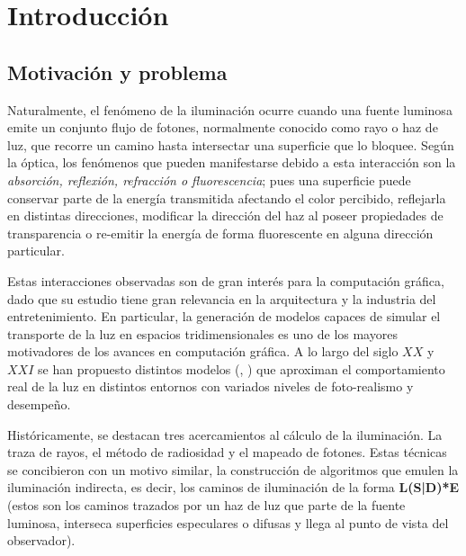 \chapter{Introducción}
\label{ch:chap01}




\section{Motivación y problema}
\label{sec:motivacionYProblemas}

Naturalmente, el fenómeno de la iluminación ocurre cuando una fuente luminosa emite un conjunto flujo de fotones, normalmente conocido como rayo o haz de luz, que recorre un camino hasta intersectar una superficie que lo bloquee. Según la óptica, los fenómenos que pueden manifestarse debido a esta interacción son la \textit{absorción, reflexión, refracción o fluorescencia}; pues una superficie puede conservar parte de la energía transmitida afectando el color percibido, reflejarla en distintas direcciones, modificar la dirección del haz al poseer propiedades de transparencia o re-emitir la energía de forma fluorescente en alguna dirección particular.

Estas interacciones observadas son de gran interés para la computación gráfica, dado que su estudio tiene gran relevancia en la arquitectura y la industria del entretenimiento. En particular, la generación de modelos capaces de simular el transporte de la luz en espacios tridimensionales es uno de los mayores motivadores de los avances en computación gráfica. A lo largo del siglo $XX$ y $XXI$ se han propuesto distintos modelos (\cite{Kajiya}, \cite{Cohen}) que aproximan el comportamiento real de la luz en distintos entornos con variados niveles de foto-realismo y desempeño.

Históricamente, se destacan tres acercamientos al cálculo de la iluminación. La traza de rayos, el método de radiosidad y el mapeado de fotones. Estas técnicas se concibieron con un motivo similar, la construcción de algoritmos que emulen la iluminación indirecta, es decir, los caminos de iluminación de la forma \textbf{L(S|D)*E} (estos son los caminos trazados por un haz de luz que parte de la fuente luminosa, interseca superficies especulares o difusas y llega al punto de vista del observador). 

